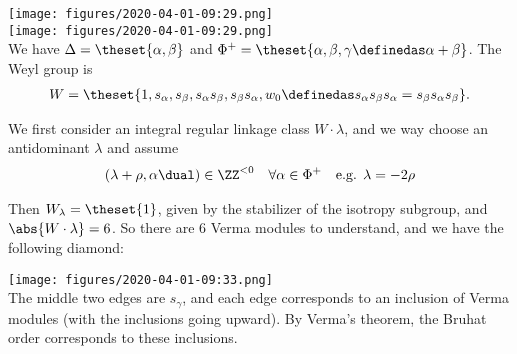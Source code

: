 \texttt{[image: figures/2020-04-01-09:29.png]}\\

\texttt{[image: figures/2020-04-01-09:29.png]}\\

We have \(\Delta = \theset{\alpha, \beta}\) and
\(\Phi^+ = \theset{\alpha, \beta, \gamma\definedas \alpha+\beta}\). The
Weyl group is
\begin{align*}
W = \theset{1, s_\alpha,s_\beta, s_\alpha s_\beta, s_\beta s_\alpha, w_0\definedas s_\alpha s_\beta s_\alpha = s_\beta s_\alpha s_\beta  }
.\end{align*}

We first consider an integral regular linkage class \(W\cdot \lambda\),
and we way choose an antidominant \(\lambda\) and assume
\begin{align*}
(\lambda + \rho, \alpha\dual) \in \ZZ^{< 0} \quad \forall \alpha \in \Phi^+ \quad \text{e.g. } \lambda = - 2\rho
\end{align*}

Then \(W_\lambda = \theset{1}\), given by the stabilizer of the isotropy
subgroup, and \(\abs{W\cdot \lambda} = 6\). So there are 6 Verma modules
to understand, and we have the following diamond:

\texttt{[image: figures/2020-04-01-09:33.png]}\\

The middle two edges are \(s_\gamma\), and each edge corresponds to an
inclusion of Verma modules (with the inclusions going upward). By
Verma's theorem, the Bruhat order corresponds to these inclusions.

